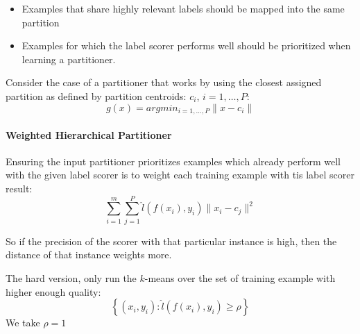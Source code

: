 \begin{itemize}
    \item Examples that share highly relevant labels should be mapped into
        the same partition
    \item Examples for which the label scorer performs well should be
        prioritized when learning a partitioner.
\end{itemize}

Consider the case of a partitioner that works by using the closest
assigned partition as defined by partition centroids:
$c_i$, $i = 1, \dots, P$:
\begin{equation}
    g(x) = argmin_{i=1,\dots, P}\|x - c_i\|
\end{equation}

\paragraph{Weighted Hierarchical Partitioner}
Ensuring the input partitioner prioritizes examples which already perform
well with the given label scorer is to weight each training example with
tis label scorer result:
\begin{equation}
    \sum_{i=1}^m\sum_{j=1}^P \hat{l}(f(x_i), y_i) \|x_i - c_j\|^2
\end{equation}

So if the precision of the scorer with that particular instance is high,
then the distance of that instance weights more.

The hard version, only run the $k$-means over the set of training example
with higher enough quality:
\[ \left\{ (x_i, y_i): \hat{l}(f(x_i), y_i) \geq \rho \right\} \]
We take $\rho = 1$

